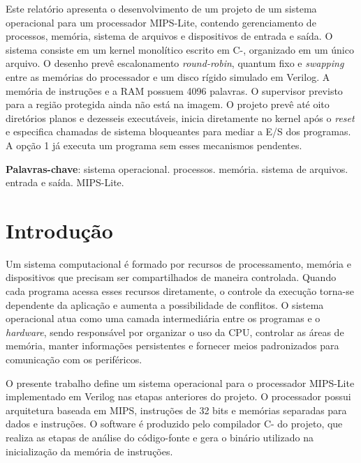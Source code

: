 \documentclass[
    12pt,
    openright,
    a4paper,
    english,
    brazilian
]{abntex2}
\begin{document}
\frenchspacing

\imprimircapa
\imprimirfolhaderosto*

\begin{resumo}
Este relatório apresenta o desenvolvimento de um projeto de um sistema operacional para um processador MIPS-Lite, contendo gerenciamento de processos, memória, sistema de arquivos e dispositivos de entrada e saída. O sistema consiste em um kernel monolítico escrito em C-, organizado em um único arquivo. O desenho prevê escalonamento \emph{round-robin}, quantum fixo e \emph{swapping} entre as memórias do processador e um disco rígido simulado em Verilog. A memória de instruções e a RAM possuem 4096 palavras. O supervisor previsto para a região protegida ainda não está na imagem. O projeto prevê até oito diretórios planos e dezesseis executáveis, inicia diretamente no kernel após o \emph{reset} e especifica chamadas de sistema bloqueantes para mediar a E/S dos programas. A opção 1 já executa um programa sem esses mecanismos pendentes.

\noindent
\textbf{Palavras-chave}: sistema operacional. processos. memória. sistema de arquivos. entrada e saída. MIPS-Lite.
\end{resumo}

\listoffigures*
\clearpage

\listoftables*
\clearpage

\tableofcontents*

\textual

\chapter{Introdução}

Um sistema computacional é formado por recursos de processamento, memória e dispositivos que precisam ser compartilhados de maneira controlada. Quando cada programa acessa esses recursos diretamente, o controle da execução torna-se dependente da aplicação e aumenta a possibilidade de conflitos. O sistema operacional atua como uma camada intermediária entre os programas e o \emph{hardware}, sendo responsável por organizar o uso da CPU, controlar as áreas de memória, manter informações persistentes e fornecer meios padronizados para comunicação com os periféricos.

O presente trabalho define um sistema operacional para o processador MIPS-Lite implementado em Verilog nas etapas anteriores do projeto. O processador possui arquitetura baseada em MIPS, instruções de 32 bits e memórias separadas para dados e instruções. O software é produzido pelo compilador C- do projeto, que realiza as etapas de análise do código-fonte e gera o binário utilizado na inicialização da memória de instruções.
\end{document}
